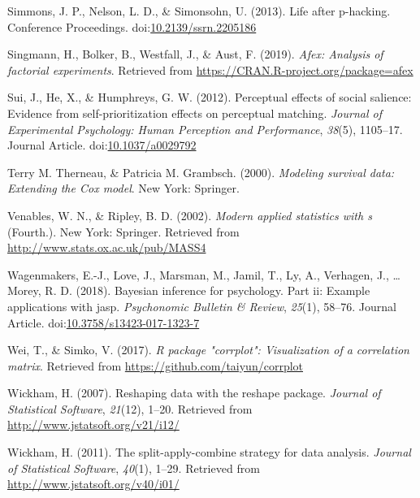 \documentclass[
  man]{apa6}
\begin{document}
\leavevmode\hypertarget{ref-Simmons_2013_life}{}%
Simmons, J. P., Nelson, L. D., \& Simonsohn, U. (2013). Life after p-hacking. Conference Proceedings. doi:\href{https://doi.org/10.2139/ssrn.2205186}{10.2139/ssrn.2205186}

\leavevmode\hypertarget{ref-R-afex}{}%
Singmann, H., Bolker, B., Westfall, J., \& Aust, F. (2019). \emph{Afex: Analysis of factorial experiments}. Retrieved from \url{https://CRAN.R-project.org/package=afex}

\leavevmode\hypertarget{ref-Sui_2012_JEPHPP}{}%
Sui, J., He, X., \& Humphreys, G. W. (2012). Perceptual effects of social salience: Evidence from self-prioritization effects on perceptual matching. \emph{Journal of Experimental Psychology: Human Perception and Performance}, \emph{38}(5), 1105--17. Journal Article. doi:\href{https://doi.org/10.1037/a0029792}{10.1037/a0029792}

\leavevmode\hypertarget{ref-R-survival-book}{}%
Terry M. Therneau, \& Patricia M. Grambsch. (2000). \emph{Modeling survival data: Extending the Cox model}. New York: Springer.

\leavevmode\hypertarget{ref-R-MASS}{}%
Venables, W. N., \& Ripley, B. D. (2002). \emph{Modern applied statistics with s} (Fourth.). New York: Springer. Retrieved from \url{http://www.stats.ox.ac.uk/pub/MASS4}

\leavevmode\hypertarget{ref-Wagenmakers_2018_JASP}{}%
Wagenmakers, E.-J., Love, J., Marsman, M., Jamil, T., Ly, A., Verhagen, J., \ldots{} Morey, R. D. (2018). Bayesian inference for psychology. Part ii: Example applications with jasp. \emph{Psychonomic Bulletin \& Review}, \emph{25}(1), 58--76. Journal Article. doi:\href{https://doi.org/10.3758/s13423-017-1323-7}{10.3758/s13423-017-1323-7}

\leavevmode\hypertarget{ref-R-corrplot2017}{}%
Wei, T., \& Simko, V. (2017). \emph{R package "corrplot": Visualization of a correlation matrix}. Retrieved from \url{https://github.com/taiyun/corrplot}

\leavevmode\hypertarget{ref-R-reshape2}{}%
Wickham, H. (2007). Reshaping data with the reshape package. \emph{Journal of Statistical Software}, \emph{21}(12), 1--20. Retrieved from \url{http://www.jstatsoft.org/v21/i12/}

\leavevmode\hypertarget{ref-R-plyr}{}%
Wickham, H. (2011). The split-apply-combine strategy for data analysis. \emph{Journal of Statistical Software}, \emph{40}(1), 1--29. Retrieved from \url{http://www.jstatsoft.org/v40/i01/}
\end{document}

